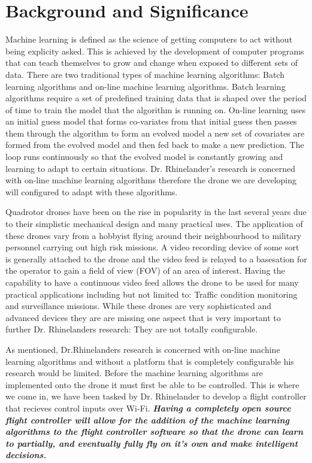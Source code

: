 \section{Background and Significance}
Machine learning is defined as the science of getting computers to act without being explicity asked. This is achieved by the development of computer programs that can teach themselves to grow and change when exposed to different sets of data. There are two traditional types of machine learning algorithms: Batch learning algorithms and on-line machine learning algorithms. Batch learning algorithms require a set of predefined training data that is shaped over the period of time to train the model that the algorithm is running on. On-line learning uses an initial guess model that forms co-variates from that initial guess then passes them through the algorithm to form an evolved model a new set of covariates are formed from the evolved model and then fed back to make a new prediction. The loop runs continuously so that the evolved model is constantly growing and learning to adapt to certain situations. Dr. Rhinelander's research is concerned with on-line machine learning algorithms therefore the drone we are developing will configured to adapt with these algorithms. 

Quadrotor drones have been on the rise in popularity in the last several years due to their simplistic mechanical design and many practical uses. The application of these drones vary from a hobbyist flying around their neighbourhood to military personnel carrying out high risk missions. A video recording device of some sort is generally attached to the drone and the video feed is relayed to a basesation for the operator to gain a field of view (FOV) of an area of interest. Having the capability to have a continuous video feed allows the drone to be used for many practical applications including but not limited to: Traffic condition monitoring and surveillance missions. While these drones are very sophisticated and advanced devices they are are missing one aspect that is very important to further Dr. Rhinelanders research: They are not totally configurable. 

As mentioned, Dr.Rhinelanders research is concerned with on-line machine learning algorithms and without a platform that is completely configurable his research would be limited. Before the machine learning algorithms are implemented onto the drone it must first be able to be controlled. This is where we come in, we have been tasked by Dr. Rhinelander to develop a flight controller that recieves control inputs over Wi-Fi. \textbf{\textit{Having a completely open source flight controller will allow for the addition of the machine learning algorithms to the flight controller software so that the drone can learn to partially, and eventually fully fly on it's own and make intelligent decisions.} }